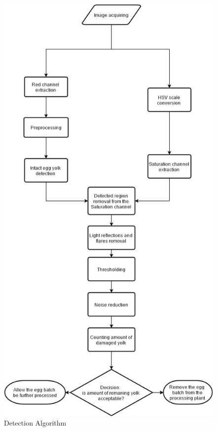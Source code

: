 \documentclass[12pt,twoside,a4paper]{article}
\begin{document}
\begin{figure}[H]
\centering
\includegraphics[width=0.5\paperwidth]{algorithmV}
\caption{Detection Algorithm}
\end{figure}
\end{document}
